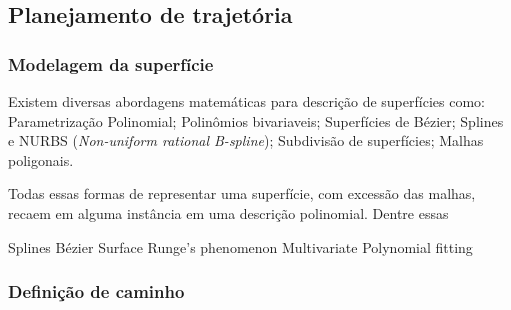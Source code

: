 \subsection{Planejamento de trajetória}

\subsubsection{Modelagem da superfície}\label{modelagem}

%





Existem diversas abordagens matemáticas para descrição de superfícies como:
Parametrização Polinomial; Polinômios bivariaveis; Superfícies de
Bézier; Splines e NURBS (\textit{Non-uniform rational B-spline}); Subdivisão de
superfícies; Malhas poligonais.

Todas essas formas de representar uma superfície, com excessão das malhas,
recaem em alguma instância em uma descrição polinomial. Dentre essas




Splines
Bézier Surface
Runge's phenomenon
Multivariate Polynomial fitting




\subsubsection{Definição de caminho}
